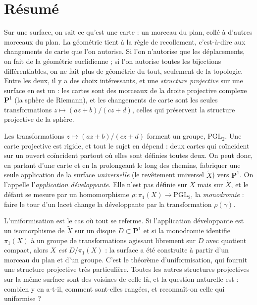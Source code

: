 \documentclass[11pt,a4paper]{article}
\begin{document}
\section*{Résumé}

\begin{resume}
Sur une surface, on sait ce qu'est une carte : un morceau du plan, collé à
d'autres morceaux du plan. La géométrie tient à la règle de
recollement, c'est-à-dire aux changements de carte que l'on autorise. Si l'on n'autorise
que les déplacements, on fait de la géométrie euclidienne ; si l'on autorise
toutes les bijections différentiables, on ne fait plus de géométrie du tout,
seulement de la topologie. Entre les deux, il y a des choix intéressants, et une
\emph{structure projective} sur une surface en est un : les
cartes sont des morceaux de la droite projective complexe $\mathbf{P}^1$ (la
sphère de Riemann), et les changements de carte sont les seules
transformations $z \mapsto (az+b)/(cz+d)$, celles qui préservent la structure
projective de la sphère.

Les
transformations $z \mapsto (az+b)/(cz+d)$ forment un groupe, $\mathrm{PGL}_2$.
Une carte projective est rigide, et tout le sujet en dépend : deux cartes qui coïncident sur un ouvert
coïncident partout où elles sont définies toutes deux. On peut donc, en
partant d'une carte et en la prolongeant le long des chemins, fabriquer une
seule application de la surface \emph{universelle} (le revêtement universel
$\widetilde{X}$) vers $\mathbf{P}^1$. On l'appelle l'\emph{application
développante}. Elle n'est pas définie sur $X$ mais sur $\widetilde{X}$, et le
défaut se mesure par un homomorphisme $\rho : \pi_1(X) \to \mathrm{PGL}_2$,
la \emph{monodromie} : faire le tour d'un lacet change la développante par
la transformation $\rho(\gamma)$.

L'uniformisation est le cas où tout se referme. Si
l'application développante est un isomorphisme de $\widetilde{X}$ sur un
disque $D \subset \mathbf{P}^1$ et si la monodromie identifie $\pi_1(X)$ à un
groupe de transformations agissant librement sur $D$ avec quotient compact,
alors $X$ \emph{est} $D/\pi_1(X)$ : la surface a été construite à partir d'un
morceau du plan et d'un groupe. C'est le théorème d'uniformisation, qui fournit
une structure projective très particulière. Toutes les autres structures
projectives sur la même surface sont des voisines de celle-là, et la question
naturelle est : combien y en a-t-il, comment sont-elles rangées, et
reconnaît-on celle qui uniformise ?


\end{resume}
\end{document}
